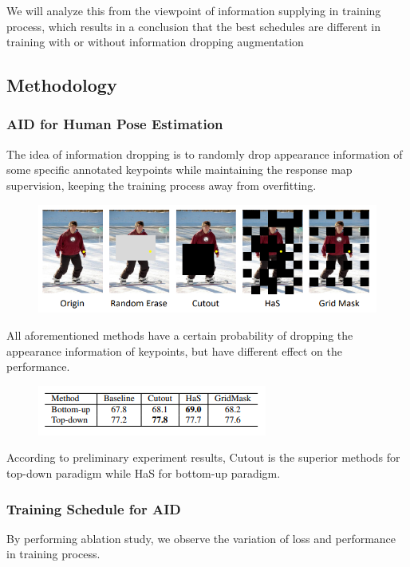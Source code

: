 \documentclass[11pt]{article}
\begin{document}
We will analyze this from the viewpoint of information supplying in training process, which results in a conclusion that the best schedules are different in training with or without information dropping augmentation
\subsection{Methodology}
\subsubsection{AID for Human Pose Estimation}
The idea of information dropping is to randomly drop appearance information of some specific annotated keypoints while maintaining the response map supervision, keeping the training process away from overfitting.

\begin{figure}[H]
	\centering
	\includegraphics[scale = 0.5]{69}
\end{figure}

All aforementioned methods have a certain probability of dropping the appearance information of keypoints, but have different effect on the performance.

\begin{figure}[H]
	\centering
	\includegraphics[scale = 0.65]{71}
\end{figure}
According to preliminary experiment results, Cutout is the superior methods for top-down paradigm while HaS for bottom-up paradigm.
\subsubsection{Training Schedule for AID}
By performing ablation study, we observe the variation of loss and performance in training process.
\end{document}
